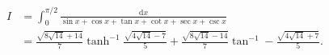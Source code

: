 %

\begin{problem}[pytanie 4058050]
    \label{stack_4058050}%
    \begin{align}
        I & =\int_0^{\pi/2} \frac{\mathrm{d}x}{\sin x + \cos x + \tan x + \cot x + \sec x + \csc x} \\
        & = \frac{\sqrt {8\sqrt {14} + 14}}{7} \tanh^{-1} \frac{\sqrt {4\sqrt {14} - 7}}{5} + \frac{\sqrt {8\sqrt {14} - 14}}{7} \tan^{-1} - \frac{\sqrt {4\sqrt {14} + 7}}{5}.
    \end{align}
\end{problem}

%